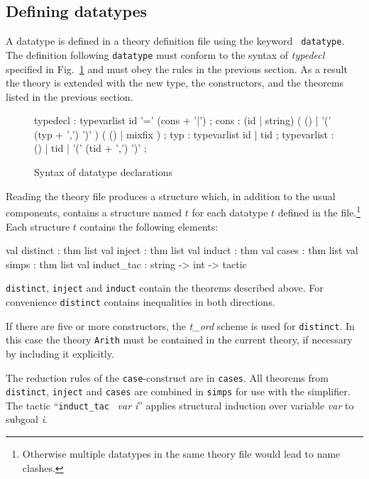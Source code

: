 \subsection{Defining datatypes}

A datatype is defined in a theory definition file using the keyword {\tt
  datatype}. The definition following {\tt datatype} must conform to the
syntax of {\em typedecl} specified in Fig.~\ref{datatype-grammar} and must
obey the rules in the previous section. As a result the theory is extended
with the new type, the constructors, and the theorems listed in the previous
section.

\begin{figure}
\begin{rail}
typedecl : typevarlist id '=' (cons + '|')
         ;
cons     : (id | string) ( () | '(' (typ + ',') ')' ) ( () | mixfix )
         ;
typ      : typevarlist id
           | tid
         ;
typevarlist : () | tid | '(' (tid + ',') ')'
         ;
\end{rail}
\caption{Syntax of datatype declarations}
\label{datatype-grammar}
\end{figure}

Reading the theory file produces a structure which, in addition to the usual
components, contains a structure named $t$ for each datatype $t$ defined in
the file.\footnote{Otherwise multiple datatypes in the same theory file would
  lead to name clashes.} Each structure $t$ contains the following elements:
\begin{ttbox}
val distinct : thm list
val inject : thm list
val induct : thm
val cases : thm list
val simps : thm list
val induct_tac : string -> int -> tactic
\end{ttbox}
{\tt distinct}, {\tt inject} and {\tt induct} contain the theorems described
above. For convenience {\tt distinct} contains inequalities in both
directions.
\begin{warn}
  If there are five or more constructors, the {\em t\_ord} scheme is used for
  {\tt distinct}.  In this case the theory {\tt Arith} must be contained
  in the current theory, if necessary by including it explicitly.
\end{warn}
The reduction rules of the {\tt case}-construct are in {\tt cases}.  All
theorems from {\tt distinct}, {\tt inject} and {\tt cases} are combined in
{\tt simps} for use with the simplifier. The tactic ``{\verb$induct_tac$~{\em
    var i}\/}'' applies structural induction over variable {\em var} to
subgoal {\em i}.



